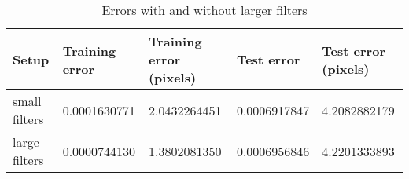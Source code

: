 \begin{table}[h!]
\centering
\footnotesize
\begin{tabular}{|l|l|l|l|l|}
	\hline
		\textbf{Setup} & \textbf{Training error} & \textbf{Training error (pixels)} & \textbf{Test error} & \textbf{Test error (pixels)}\\
	\hline
		small filters	& 0.0001630771%
						& 2.0432264451%
						& 0.0006917847%
						& 4.2082882179%
						\\
	\hline
		large filters	& 0.0000744130%
						& 1.3802081350%
						& 0.0006956846%
						& 4.2201333893%
						\\
	\hline
	\end{tabular}
	\normalsize
	\caption{Errors with and without larger filters}
	\label{tab:cnn_errors_largerfilters}
\end{table}
